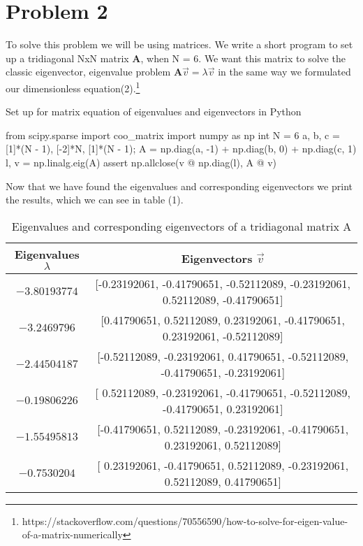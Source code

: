 \documentclass[english,notitlepage]{revtex4-1}  %
\begin{document}
\section*{Problem 2}
To solve this problem we will be using matrices. We write a short program to set up a tridiagonal NxN matrix \textbf{A}, when N = 6. We want this matrix to solve the classic eigenvector, eigenvalue problem $\mathbf{A}\vec{v} = \lambda \vec{v}$ in the same way we formulated our dimensionless equation(2).\footnote{https://stackoverflow.com/questions/70556590/how-to-solve-for-eigen-value-of-a-matrix-numerically}
\begin{algorithm}[H]
    \caption{Set up for matrix equation of eigenvalues and eigenvectors in Python}\label{av_lik_lv}
    \begin{algorithmic}
	\State from scipy.sparse import coo\_matrix
	\State import numpy as np
        \State int N = 6  
        \State a, b, c = [1]*(N - 1), [-2]*N, [1]*(N - 1);  
 	\State A = np.diag(a, -1) + np.diag(b, 0) + np.diag(c, 1)
        \State l, v = np.linalg.eig(A)  
        \State assert np.allclose(v @ np.diag(l), A @ v)
    \end{algorithmic}
\end{algorithm}
Now that we have found the eigenvalues and corresponding eigenvectors we print the results, which we can see in table (1). 
\begin{table}%
    \centering
    \caption{Eigenvalues and corresponding eigenvectors of a tridiagonal matrix A}
    \begin{tabular}{c@{\hspace{1cm}} c}
        \hline
        Eigenvalues $\lambda$ & Eigenvectors $\vec{v}$ \\
        \hline
       $-3.80193774$ & [-0.23192061, -0.41790651, -0.52112089, -0.23192061, 0.52112089, -0.41790651]\\
        $-3.2469796$ &  [0.41790651,  0.52112089,  0.23192061, -0.41790651,  0.23192061, -0.52112089] \\
        $-2.44504187$ & [-0.52112089, -0.23192061,  0.41790651, -0.52112089, -0.41790651, -0.23192061]\\
        $-0.19806226$ &  [ 0.52112089, -0.23192061, -0.41790651, -0.52112089, -0.41790651,  0.23192061]\\
        $-1.55495813$ &  [-0.41790651,  0.52112089, -0.23192061, -0.41790651,  0.23192061,  0.52112089]\\
        $-0.7530204$ & [ 0.23192061, -0.41790651,  0.52112089, -0.23192061,  0.52112089,  0.41790651]\\
        \hline
    \end{tabular}\label{tab:output_table}
\end{table}
\end{document}
